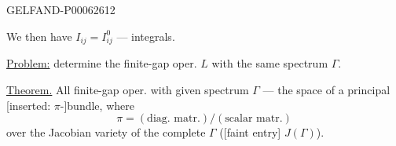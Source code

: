 \begin{GelfandAdjacentEvidence}{GELFAND-P000626}{12}

We then have \(I_{ij}=I_{ij}^0\) --- integrals.

\underline{Problem:} determine the finite-gap oper. \(L\) with the same spectrum \(\Gamma\).

\underline{Theorem.} All finite-gap oper. with given spectrum \(\Gamma\)
--- the space of a principal [inserted: \(\pi\)-]bundle, where
\[
\pi=(\text{diag. matr.})/(\text{scalar matr.})
\]
over the Jacobian variety of the complete \(\Gamma\)
([faint entry] \(J(\Gamma)\)).
\end{GelfandAdjacentEvidence}



